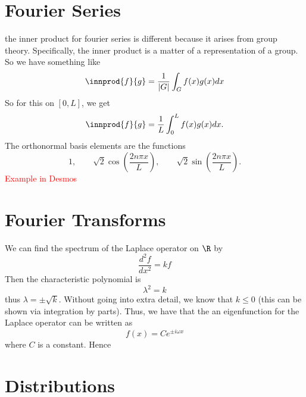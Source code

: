 \section{Fourier Series}
the inner product for fourier series is different because it arises from group theory. Specifically, the inner product is a matter of a representation of a group.  So we have something like 
\[
\innprod{f}{g} = \frac{1}{|G|} \int_G f(x)g(x)dx
\]
So for this on $[0,L]$, we get
\[
\innprod{f}{g} = \frac{1}{L} \int_0^L f(x)g(x)dx.
\]
The orthonormal basis elements are the functions
\[
1, \qquad \sqrt{2}\cos\left(\frac{2n \pi x }{L}\right), \qquad \sqrt{2}\sin\left(\frac{2n \pi x}{L} \right).
\]
\textcolor{red}{Example in Desmos}

\section{Fourier Transforms}
We can find the spectrum of the Laplace operator on $\R$ by
\[
\frac{d^2f}{dx^2} = kf
\]
Then the characteristic polynomial is
\[
\lambda^2=k
\]
thus $\lambda = \pm \sqrt{k}$. Without going into extra detail, we know that $k\leq 0$ (this can be shown via integration by parts).  Thus, we have that the an eigenfunction for the Laplace operator can be written as
\[
f(x)=Ce^{\pm i\omega x}
\]
where $C$ is a constant.  Hence
\section{Distributions}